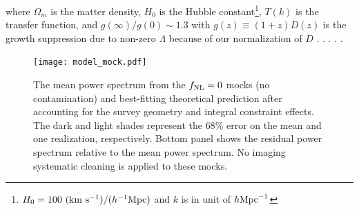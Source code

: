 where $\Omega_{m}$ is the matter density, $H_{0}$ is the Hubble constant\footnote{$H_{0}=100~({\rm km}~{\rm s}^{-1})/(h^{-1}{\rm Mpc})$ and $k$ is in unit of $h {\rm Mpc}^{-1}$}, $T(k)$ is the transfer function, and $g(\infty)/g(0) \sim 1.3$ with $g(z)\equiv (1+z) D(z)$ is the growth suppression due to non-zero $\Lambda$ because of our normalization of $D$ \citep[see, e.g.,][]{2010JCAP...07..013R, 2019MNRAS.485.4160M}. .  \citep{fillmore1984self}. \citep[see, also,][]{slosar2008constraints,2010JCAP...07..013R,2013MNRAS.428.1116R}.  \citep{2022JCAP...11..013B}.

\begin{figure}
\centering
\texttt{[image: model\_mock.pdf]}
\caption{ The mean power spectrum from the $f_{\rm NL}=0$ mocks (no contamination) and best-fitting theoretical prediction after accounting for the survey geometry and integral constraint effects. The dark and light shades represent the $68\%$ error on the mean and one realization, respectively. Bottom panel shows the residual power spectrum relative to the mean power spectrum. No imaging systematic cleaning is applied to these mocks.}\label{fig:model_mock}
\end{figure}

